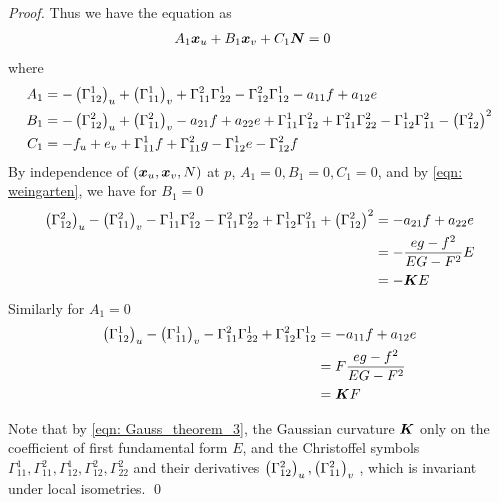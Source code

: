 \documentclass[11pt]{article}
\begin{document}
\begin{itemize}
\begin{proof}
Thus we have the equation as 
\begin{align*}
A_{1}\boldsymbol{x}_{u}+ B_{1}\boldsymbol{x}_{v}+ C_{1}\boldsymbol{N} &= 0
\end{align*}
where
\begin{align}
A_{1} &= -\left(\Gamma_{12}^{1}\right)_{u}+\left(\Gamma_{11}^{1}\right)_{v} +   \Gamma_{11}^{2}\Gamma_{22}^{1}  - \Gamma_{12}^{2}\Gamma_{12}^{1}- a_{11}f+ a_{12}e\nonumber\\
B_{1} &= -\left(\Gamma_{12}^{2}\right)_{u}+ \left(\Gamma_{11}^{2}\right)_{v} - a_{21}f + a_{22}e+ \Gamma_{11}^{1}\Gamma_{12}^{2} + \Gamma_{11}^{2}\Gamma_{22}^{2} - \Gamma_{12}^{1}\Gamma_{11}^{2} - \left(\Gamma_{12}^{2}\right)^{2}\nonumber\\
C_{1} &=  -f_{u}+e_{v}+ \Gamma_{11}^{1}f + \Gamma_{11}^{2}g   - \Gamma_{12}^{1}e - \Gamma_{12}^{2}f \nonumber
\end{align}
By independence of $(\boldsymbol{x}_{u}, \boldsymbol{x}_{v}, N)$ at $p$, $A_{1}=0, B_{1}=0, C_{1} = 0$, and by \eqref{eqn: weingarten}, we have for $B_{1} = 0$
\begin{align}
\left(\Gamma_{12}^{2}\right)_{u}- \left(\Gamma_{11}^{2}\right)_{v} - \Gamma_{11}^{1}\Gamma_{12}^{2} - \Gamma_{11}^{2}\Gamma_{22}^{2} + \Gamma_{12}^{1}\Gamma_{11}^{2} +\left(\Gamma_{12}^{2}\right)^{2} &=- a_{21}f + a_{22}e\nonumber\\
&= -\frac{eg - f^{2}}{EG- F^{2}}E \nonumber\\
&= -\boldsymbol{K}E \label{eqn: Gauss_theorem_3}
\end{align}
Similarly for $A_{1} = 0$
\begin{align*}
\left(\Gamma_{12}^{1}\right)_{u}-\left(\Gamma_{11}^{1}\right)_{v} -   \Gamma_{11}^{2}\Gamma_{22}^{1}  + \Gamma_{12}^{2}\Gamma_{12}^{1}&= - a_{11}f+ a_{12}e\\
&= F\frac{eg - f^{2}}{EG- F^{2}}\\
&=\boldsymbol{K}F 
\end{align*}

Note that by \eqref{eqn: Gauss_theorem_3}, the Gaussian curvature $\boldsymbol{K}$ only on the coefficient of first fundamental form $E$, and the Christoffel symbols $\Gamma_{11}^{1}, \Gamma_{11}^{2},  \Gamma_{12}^{1}, \Gamma_{12}^{2}, \Gamma_{22}^{2} $ and their derivatives $\left(\Gamma_{12}^{2}\right)_{u}, \left(\Gamma_{11}^{2}\right)_{v}$ , which is invariant under local isometries. \qed
\end{proof}\vspace{10pt}


\end{itemize}
\end{document}

